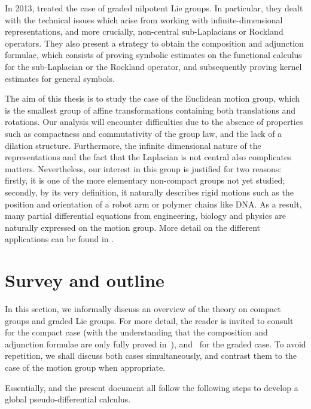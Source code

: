 In 2013,
\citeauthor{FischerRuzhansky12} treated the case of graded nilpotent Lie groups.
In particular,
they dealt with the technical issues which arise from working with infinite-dimensional representations,
and more crucially,
non-central sub-Laplacians or Rockland operators.
They also present a strategy to obtain the composition and adjunction formulae,
which consists of proving symbolic estimates on the functional calculus for the sub-Laplacian or the Rockland operator,
and subsequently proving kernel estimates for general symbols.

The aim of this thesis is to study the case of the Euclidean motion group,
which is the smallest group of affine transformations containing both translations and rotations.
Our analysis will encounter difficulties due to the absence of properties such as compactness and commutativity of the group law,
and the lack of a dilation structure.
Furthermore, the infinite dimensional nature of the representations
and the fact that the Laplacian is not central also complicates matters.
Nevertheless, our interest in this group is justified for two reasons:
firstly, it is one of the more elementary non-compact groups not yet studied;
secondly, by its very definition,
it naturally describes rigid motions such as the position and orientation of a robot arm or polymer chains like DNA.
As a result,
many partial differential equations from engineering, biology and physics
are naturally expressed on the motion group.
More detail on the different applications can be found in \cite{ChirikjianWang04,ChirikjianKyatkin00,Chirikjian13}.

\section{Survey and outline}

In this section,
we informally discuss an overview of the theory on compact groups and graded Lie groups.
For more detail,
the reader is invited to consult~\cite{RuzhanskyTurunen10} for the compact case
(with the understanding that the composition and adjunction formulae are only fully proved in~\cite{Fischer2015}),
and~\cite{FischerRuzhansky16} for the graded case.
To avoid repetition,
we shall discuss both cases simultaneously,
and contrast them to the case of the motion group when appropriate.

Essentially,
\cite{Fischer2015,FischerRuzhansky16} and the present document
all follow the following steps
to develop a global pseudo-differential calculus.

